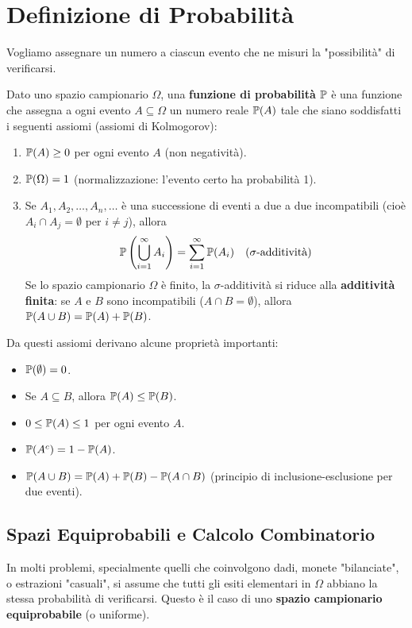 \documentclass[12pt,a4paper]{article}
\begin{document}
\section{Definizione di Probabilità}
Vogliamo assegnare un numero a ciascun evento che ne misuri la "possibilità" di verificarsi.

\begin{definition}[Probabilità]
Dato uno spazio campionario $\Omega$, una \textbf{funzione di probabilità} $\mathbb{P}$ è una funzione che assegna a ogni evento $A \subseteq \Omega$ un numero reale $\mathbb{P}(A)$ tale che siano soddisfatti i seguenti assiomi (assiomi di Kolmogorov):
\begin{enumerate}
    \item $\mathbb{P}(A) \ge 0$ per ogni evento $A$ (non negatività).
    \item $\mathbb{P}(\Omega) = 1$ (normalizzazione: l'evento certo ha probabilità 1).
    \item Se $A_1, A_2, \dots, A_n, \dots$ è una successione di eventi a due a due incompatibili (cioè $A_i \cap A_j = \emptyset$ per $i \neq j$), allora
    \[ \mathbb{P}\left(\bigcup_{i=1}^{\infty} A_i\right) = \sum_{i=1}^{\infty} \mathbb{P}(A_i) \quad (\sigma\text{-additività}) \]
    Se lo spazio campionario $\Omega$ è finito, la $\sigma$-additività si riduce alla \textbf{additività finita}: se $A$ e $B$ sono incompatibili ($A \cap B = \emptyset$), allora $\mathbb{P}(A \cup B) = \mathbb{P}(A) + \mathbb{P}(B)$.
\end{enumerate}
\end{definition}

Da questi assiomi derivano alcune proprietà importanti:
\begin{itemize}
    \item $\mathbb{P}(\emptyset) = 0$.
    \item Se $A \subseteq B$, allora $\mathbb{P}(A) \le \mathbb{P}(B)$.
    \item $0 \le \mathbb{P}(A) \le 1$ per ogni evento $A$.
    \item $\mathbb{P}(A^c) = 1 - \mathbb{P}(A)$.
    \item $\mathbb{P}(A \cup B) = \mathbb{P}(A) + \mathbb{P}(B) - \mathbb{P}(A \cap B)$ (principio di inclusione-esclusione per due eventi).
\end{itemize}

\subsection{Spazi Equiprobabili e Calcolo Combinatorio}
In molti problemi, specialmente quelli che coinvolgono dadi, monete "bilanciate", o estrazioni "casuali", si assume che tutti gli esiti elementari in $\Omega$ abbiano la stessa probabilità di verificarsi. Questo è il caso di uno \textbf{spazio campionario equiprobabile} (o uniforme).
\end{document}
